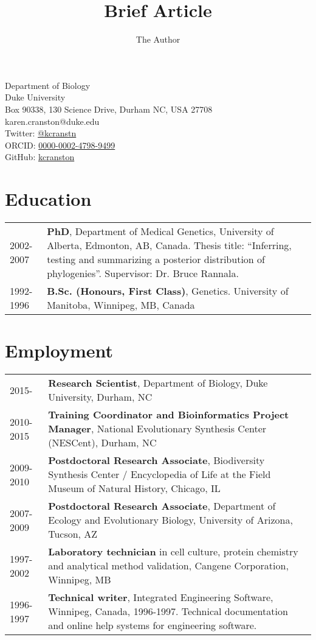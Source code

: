 \documentclass[10pt]{article}
\title{Brief Article}
\author{The Author}
\begin{document}
Department of Biology  \\
Duke University \\
Box 90338, 130 Science Drive, Durham NC, USA 27708 \\
karen.cranston@duke.edu \\
Twitter: \href{https://twitter.com/kcranstn}{@kcranstn} \\
ORCID: \href{http://orcid.org/0000-0002-4798-9499}{0000-0002-4798-9499} \\
GitHub: \href{https://github.com/kcranston}{kcranston}

\section*{Education}
\begin{table}[h]
	\begin{tabular}{ p{2.0cm} p{12.4cm} }
		2002-2007 & {\bf PhD}, Department of Medical Genetics, University of Alberta, Edmonton, AB, Canada. Thesis title: ``Inferring, testing and summarizing a posterior distribution of phylogenies''. Supervisor: Dr. Bruce Rannala. \\
		1992-1996 & {\bf B.Sc. (Honours, First Class)}, Genetics. University of Manitoba, Winnipeg, MB, Canada \\
	\end{tabular}
\end{table}

\section*{Employment}
\begin{table}[h]
	\begin{tabular}{ p{2.0cm} p{12.4cm} }
		2015- & \textbf{Research Scientist}, Department of Biology, Duke University, Durham, NC \\
		2010-2015 & \textbf{Training Coordinator and Bioinformatics Project Manager}, National Evolutionary Synthesis Center (NESCent), Durham, NC \\
		2009-2010 & \textbf{Postdoctoral Research Associate}, Biodiversity Synthesis Center / Encyclopedia of Life at the Field Museum of Natural History, Chicago, IL  \\
		2007-2009 & \textbf{Postdoctoral Research Associate}, Department of Ecology and Evolutionary Biology, University of Arizona, Tucson, AZ \\
		1997-2002 & \textbf{Laboratory technician} in cell culture, protein chemistry and analytical method validation, Cangene Corporation, Winnipeg, MB \\
		1996-1997 & \textbf{Technical writer}, Integrated Engineering Software, Winnipeg, Canada, 1996-1997. Technical documentation and online help systems for engineering software. \\
	\end{tabular}
\end{table}
\end{document}
